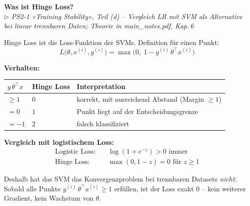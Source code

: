 \documentclass[11pt, a4paper]{article}
\newenvironment{frage}[2]{%
  \begin{tcolorbox}[frageboxstyle, title={Frage}]
  \textbf{#1}\\[3pt]
  {\small\itshape\color{black!55}\(\triangleright\) #2}
  \end{tcolorbox}
  \begin{tcolorbox}[antwortboxstyle]
}{%
  \end{tcolorbox}
  \vspace{4mm}
}
\begin{document}
\begin{frage}{Was ist Hinge Loss?}{PS2-1 »Training Stability«, Teil (d) -- Vergleich LR mit SVM als Alternative bei linear trennbaren Daten; Theorie in main\_notes.pdf, Kap.\,6}

Hinge Loss ist die Loss-Funktion der SVMs. Definition für einen Punkt:
\[
  L\!\bigl(\theta, x^{(i)}, y^{(i)}\bigr)
  = \max\!\bigl(0,\; 1 - y^{(i)}\,\theta^\top x^{(i)}\bigr)
\]

\textbf{Verhalten:}
\begin{center}
\begin{tabular}{lll}
  \toprule
  $y\,\theta^\top x$ & Hinge Loss & Interpretation \\
  \midrule
  $\geq 1$ & $0$ & korrekt, mit ausreichend Abstand (Margin $\geq 1$) \\
  $= 0$    & $1$ & Punkt liegt auf der Entscheidungsgrenze \\
  $= -1$   & $2$ & falsch klassifiziert \\
  \bottomrule
\end{tabular}
\end{center}

\begin{center}
\end{center}

\textbf{Vergleich mit logistischem Loss:}
\begin{align*}
  \text{Logistic Loss:} &\quad \log(1 + e^{-z}) > 0 \text{ immer} \\
  \text{Hinge Loss:}    &\quad \max(0, 1-z) = 0 \text{ für } z \geq 1
\end{align*}

Deshalb hat das SVM das Konvergenzproblem bei trennbaren Datasets \emph{nicht}: Sobald alle Punkte
$y^{(i)}\,\theta^\top x^{(i)} \geq 1$ erfüllen, ist der Loss exakt $0$ -- kein weiterer Gradient,
kein Wachstum von $\theta$.

\end{frage}
\end{document}
